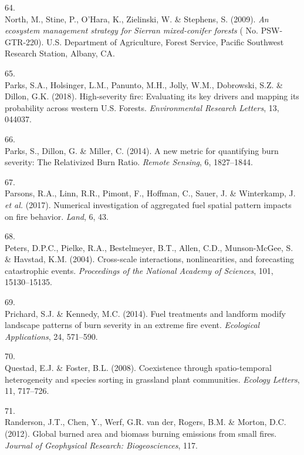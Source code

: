 \documentclass[]{article}
\begin{document}
\leavevmode\hypertarget{ref-north2009a}{}%
64.\\
North, M., Stine, P., O'Hara, K., Zielinski, W. \& Stephens, S. (2009).
\emph{An ecosystem management strategy for Sierran mixed-conifer
forests} ( No. PSW-GTR-220). U.S. Department of Agriculture, Forest
Service, Pacific Southwest Research Station, Albany, CA.

\leavevmode\hypertarget{ref-parks2018}{}%
65.\\
Parks, S.A., Holsinger, L.M., Panunto, M.H., Jolly, W.M., Dobrowski,
S.Z. \& Dillon, G.K. (2018). High-severity fire: Evaluating its key
drivers and mapping its probability across western U.S. Forests.
\emph{Environmental Research Letters}, 13, 044037.

\leavevmode\hypertarget{ref-parks2014a}{}%
66.\\
Parks, S., Dillon, G. \& Miller, C. (2014). A new metric for quantifying
burn severity: The Relativized Burn Ratio. \emph{Remote Sensing}, 6,
1827--1844.

\leavevmode\hypertarget{ref-parsons2017}{}%
67.\\
Parsons, R.A., Linn, R.R., Pimont, F., Hoffman, C., Sauer, J. \&
Winterkamp, J. \emph{et al.} (2017). Numerical investigation of
aggregated fuel spatial pattern impacts on fire behavior. \emph{Land},
6, 43.

\leavevmode\hypertarget{ref-peters2004}{}%
68.\\
Peters, D.P.C., Pielke, R.A., Bestelmeyer, B.T., Allen, C.D.,
Munson-McGee, S. \& Havstad, K.M. (2004). Cross-scale interactions,
nonlinearities, and forecasting catastrophic events. \emph{Proceedings
of the National Academy of Sciences}, 101, 15130--15135.

\leavevmode\hypertarget{ref-prichard2014}{}%
69.\\
Prichard, S.J. \& Kennedy, M.C. (2014). Fuel treatments and landform
modify landscape patterns of burn severity in an extreme fire event.
\emph{Ecological Applications}, 24, 571--590.

\leavevmode\hypertarget{ref-questad2008}{}%
70.\\
Questad, E.J. \& Foster, B.L. (2008). Coexistence through
spatio-temporal heterogeneity and species sorting in grassland plant
communities. \emph{Ecology Letters}, 11, 717--726.

\leavevmode\hypertarget{ref-randerson2012}{}%
71.\\
Randerson, J.T., Chen, Y., Werf, G.R. van der, Rogers, B.M. \& Morton,
D.C. (2012). Global burned area and biomass burning emissions from small
fires. \emph{Journal of Geophysical Research: Biogeosciences}, 117.
\end{document}

